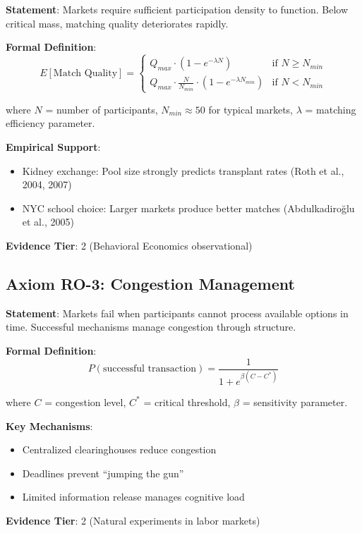 \begin{tcolorbox}[colback=blue!5!white,colframe=blue!75!black,title=Axiom RO-2: Thickness Principle]
\textbf{Statement}: Markets require sufficient participation density to function. Below critical mass, matching quality deteriorates rapidly.

\textbf{Formal Definition}:
\begin{equation}
E[\text{Match Quality}] = \begin{cases}
Q_{max} \cdot (1 - e^{-\lambda N}) & \text{if } N \geq N_{min} \\
Q_{max} \cdot \frac{N}{N_{min}} \cdot (1 - e^{-\lambda N_{min}}) & \text{if } N < N_{min}
\end{cases}
\end{equation}

where $N$ = number of participants, $N_{min} \approx 50$ for typical markets, $\lambda$ = matching efficiency parameter.

\textbf{Empirical Support}:
\begin{itemize}
    \item Kidney exchange: Pool size strongly predicts transplant rates (Roth et al., 2004, 2007)
    \item NYC school choice: Larger markets produce better matches (Abdulkadiroğlu et al., 2005)
\end{itemize}

\textbf{Evidence Tier}: 2 (Behavioral Economics observational)
\end{tcolorbox}

\subsection{Axiom RO-3: Congestion Management}

\begin{tcolorbox}[colback=blue!5!white,colframe=blue!75!black,title=Axiom RO-3: Congestion Management]
\textbf{Statement}: Markets fail when participants cannot process available options in time. Successful mechanisms manage congestion through structure.

\textbf{Formal Definition}:
\begin{equation}
P(\text{successful transaction}) = \frac{1}{1 + e^{\beta(C - C^*)}}
\end{equation}

where $C$ = congestion level, $C^*$ = critical threshold, $\beta$ = sensitivity parameter.

\textbf{Key Mechanisms}:
\begin{itemize}
    \item Centralized clearinghouses reduce congestion
    \item Deadlines prevent ``jumping the gun''
    \item Limited information release manages cognitive load
\end{itemize}

\textbf{Evidence Tier}: 2 (Natural experiments in labor markets)
\end{tcolorbox}

